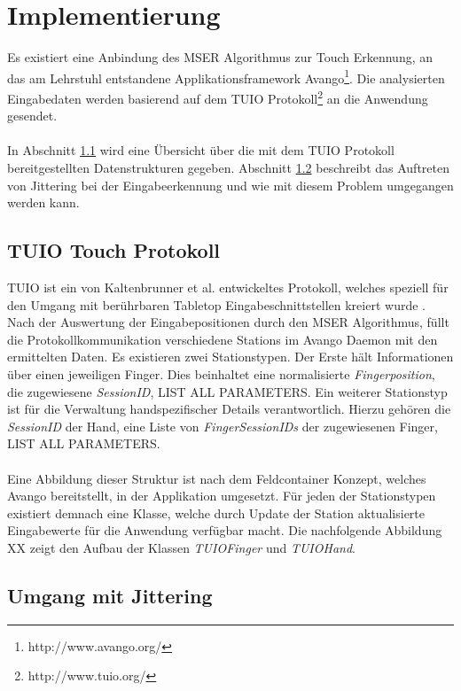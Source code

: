 \section{Implementierung}
\label{sec:implementierung_mser}
Es existiert eine Anbindung des MSER Algorithmus zur Touch Erkennung, an das am Lehrstuhl entstandene Applikationsframework Avango\footnote{http://www.avango.org/}. Die analysierten Eingabedaten werden basierend auf dem TUIO Protokoll\footnote{http://www.tuio.org/} an die Anwendung gesendet.
\\\\
In Abschnitt \ref{subsec:tuio_touch_protokoll} wird eine Übersicht über die mit dem TUIO Protokoll bereitgestellten Datenstrukturen gegeben. Abschnitt \ref{subsec:umgang_mit_jittering} beschreibt das Auftreten von Jittering bei der Eingabeerkennung und wie mit diesem Problem umgegangen werden kann.


\subsection{TUIO Touch Protokoll}
\label{subsec:tuio_touch_protokoll}

TUIO ist ein von Kaltenbrunner et al. entwickeltes Protokoll, welches speziell für den Umgang mit berührbaren Tabletop Eingabeschnittstellen kreiert wurde \cite{kaltenbrunner:2005}. Nach der Auswertung der Eingabepositionen durch den MSER Algorithmus, füllt die Protokollkommunikation verschiedene Stations im Avango Daemon mit den ermittelten Daten. Es existieren zwei Stationstypen. Der Erste hält Informationen über einen jeweiligen Finger. Dies beinhaltet eine normalisierte \emph{Fingerposition}, die zugewiesene \emph{SessionID}, LIST ALL PARAMETERS. Ein weiterer Stationstyp ist für die Verwaltung handspezifischer Details verantwortlich. Hierzu gehören die \emph{SessionID} der Hand, eine Liste von \emph{FingerSessionIDs} der zugewiesenen Finger, LIST ALL PARAMETERS.
\\\\
Eine Abbildung dieser Struktur ist nach dem Feldcontainer Konzept, welches Avango bereitstellt, in der Applikation umgesetzt. Für jeden der Stationstypen existiert demnach eine Klasse, welche durch Update der Station aktualisierte Eingabewerte für die Anwendung verfügbar macht. Die nachfolgende Abbildung XX zeigt den Aufbau der Klassen \emph{TUIOFinger} und \emph{TUIOHand}.


\subsection{Umgang mit Jittering}
\label{subsec:umgang_mit_jittering}


